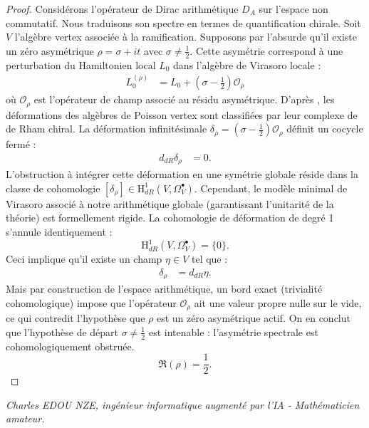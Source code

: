 \documentclass[
]{article}
\begin{document}
\begin{proof}
Considérons l'opérateur de Dirac arithmétique $D_A$ sur l'espace non commutatif. Nous traduisons son spectre en termes de quantification chirale. Soit $V$ l'algèbre vertex associée à la ramification. Supposons par l'absurde qu'il existe un zéro asymétrique $\rho = \sigma + it$ avec $\sigma \neq \frac{1}{2}$.
Cette asymétrie correspond à une perturbation du Hamiltonien local $L_0$ dans l'algèbre de Virasoro locale :
\begin{align*}
    L_0^{(\rho)} &= L_0 + \left(\sigma - \frac{1}{2}\right) \mathcal{O}_{\rho}
\end{align*}
où $\mathcal{O}_{\rho}$ est l'opérateur de champ associé au résidu asymétrique. D'après \cite{butson2026}, les déformations des algèbres de Poisson vertex sont classifiées par leur complexe de de Rham chiral. La déformation infinitésimale $\delta_{\rho} = (\sigma - \frac{1}{2}) \mathcal{O}_{\rho}$ définit un cocycle fermé :
\begin{align*}
    d_{dR} \delta_{\rho} &= 0.
\end{align*}
L'obstruction à intégrer cette déformation en une symétrie globale réside dans la classe de cohomologie $[\delta_{\rho}] \in \mathrm{H}_{dR}^1(V, \Omega^\bullet_V)$. Cependant, le modèle minimal de Virasoro associé à notre arithmétique globale (garantissant l'unitarité de la théorie) est formellement rigide. La cohomologie de déformation de degré 1 s'annule identiquement :
\begin{equation*}
    \mathrm{H}_{dR}^1(V, \Omega^\bullet_V) = \{0\}.
\end{equation*}
Ceci implique qu'il existe un champ $\eta \in V$ tel que :
\begin{align*}
    \delta_{\rho} &= d_{dR} \eta.
\end{align*}
Mais par construction de l'espace arithmétique, un bord exact (trivialité cohomologique) impose que l'opérateur $\mathcal{O}_{\rho}$ ait une valeur propre nulle sur le vide, ce qui contredit l'hypothèse que $\rho$ est un zéro asymétrique actif.
On en conclut que l'hypothèse de départ $\sigma \neq \frac{1}{2}$ est intenable : l'asymétrie spectrale est cohomologiquement obstruée.
\begin{equation*}
    \Re(\rho) = \frac{1}{2}.
\end{equation*}
\end{proof}

\vspace{1cm}
\begin{flushright}
\textit{Charles EDOU NZE, ingénieur informatique augmenté par l'IA - Mathématicien amateur.}
\end{flushright}
\end{document}
